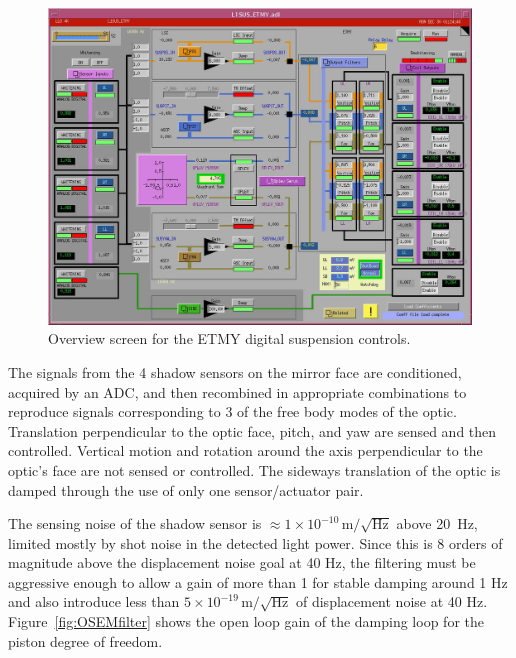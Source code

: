 \begin{figure}[!h]
\centerline{
\includegraphics[angle=0,width=6.5in]{Figures/Chap5/L1SUS_ETMY.jpg}}
\caption[SUS Screen]{Overview screen for the ETMY digital suspension controls.}
\label{fig:SUSscreen}
\end{figure}

The signals from the 4 shadow sensors on the mirror face are conditioned,
acquired by an ADC, and then recombined in appropriate combinations to
reproduce signals corresponding to 3 of the free body modes of the optic.
Translation perpendicular to the optic face, pitch, and yaw are sensed
and then controlled. Vertical motion and rotation around the axis perpendicular
to the optic's face are not sensed or controlled. The sideways translation
of the optic is damped through the use of only one sensor/actuator pair.

The sensing noise of the shadow sensor 
is $\approx1 \times 10^{-10} \, \mbox{m}/\sqrt{\mbox{Hz}}$
above 20~Hz, limited mostly by shot noise in the detected light power. Since this
is 8 orders of magnitude above the displacement noise goal at 40 Hz, the filtering
must be aggressive enough to allow a gain of more than 1 for stable damping around 
1 Hz and also introduce less than 
$5 \times 10^{-19} \, \mbox{m}/\sqrt{\mbox{Hz}}$ of displacement noise at 40 Hz. 
Figure~\ref{fig:OSEMfilter} shows the open loop gain of the damping loop for
the piston degree of freedom.


